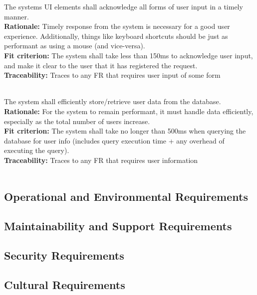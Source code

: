 \documentclass[12pt, titlepage]{article}
\newcounter{NFR_Counter}
\newcounter{FR_Counter}
\begin{document}
The systems UI elements shall acknowledge all forms of user input in a timely manner.\\
\textbf{Rationale:}
Timely response from the system is necessary for a good user experience. Additionally, things like keyboard
shortcuts should be just as performant as using a mouse (and vice-versa).\\
\textbf{Fit criterion:}
The system shall take less than 150ms to acknowledge user input, and make it clear to the user that it has registered the request.\\
\textbf{Traceability:}
Traces to any FR that requires user input of some form \\~\\
\addtocounter{NFR_Counter}{1}


The system shall efficiently store/retrieve user data from the database.\\
\textbf{Rationale:}
For the system to remain performant, it must handle data efficiently, especially as the total number of users increase.\\
\textbf{Fit criterion:}
The system shall take no longer than 500ms when querying the database for user info (includes query execution time + any overhead of executing 
the query).\\
\textbf{Traceability:}
Traces to any FR that requires user information \\~\\
\addtocounter{NFR_Counter}{1}

\subsection{Operational and Environmental Requirements}

\subsection{Maintainability and Support Requirements}

\subsection{Security Requirements}

\subsection{Cultural Requirements}
\end{document}
